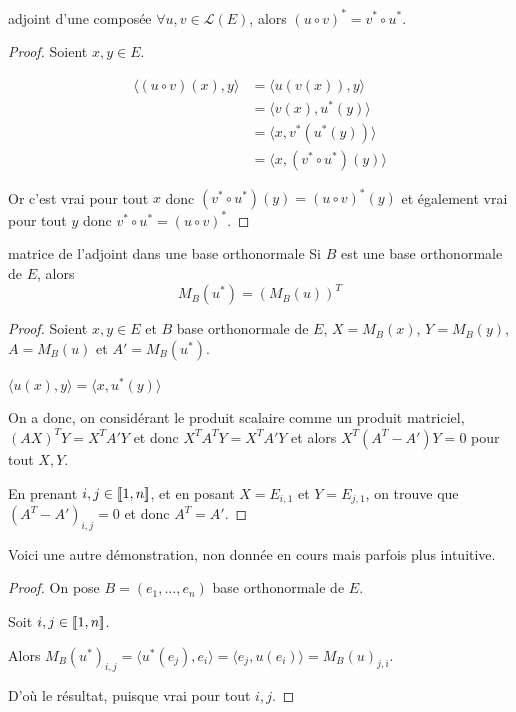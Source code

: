 \begin{proposition}{adjoint d'une composée}{}
    $\forall u, v \in \mathscr L(E)$, alors $(u \circ v)^* = v^* \circ u^*$.
\end{proposition}


\begin{proof}
    Soient $x, y \in E$. 

    \begin{align}
        \langle (u \circ v)(x), y \rangle & = \langle u(v(x)), y \rangle \\
        & = \langle v(x), u^*(y) \rangle \\
        & = \langle x, v^*(u^*(y)) \rangle \\
        & = \langle x, (v^* \circ u^*)(y) \rangle
    \end{align}

    Or c'est vrai pour tout $x$ donc $(v^* \circ u^*)(y) = (u \circ v)^*(y)$ et 
    également vrai pour tout $y$ donc $v^* \circ u^* = (u \circ v)^*$.
\end{proof}

\begin{proposition}{matrice de l'adjoint dans une base orthonormale}{}
    Si $B$ est une base orthonormale de $E$, alors 
    $$M_B(u^*) = (M_B(u))^T$$
\end{proposition}

\begin{proof}
    Soient $x, y \in E$ et $B$ base orthonormale de $E$, $X = M_B(x)$, $Y = M_B(y)$, 
    $A = M_B(u)$ et $A' = M_B(u^*)$.

    $\langle u(x), y \rangle = \langle x, u^*(y) \rangle$ 

    On a donc, on considérant le produit scalaire comme un produit matriciel, 
    $(AX)^T Y = X^T A' Y$ et donc $X^T A^T Y = X^T A' Y$ 
    et alors $X^T(A^T - A') Y = 0$ pour tout $X, Y$.

    En prenant $i, j \in [\![1, n]\!]$, et en posant $X = E_{i, 1}$ et $Y = E_{j, 1}$, 
    on trouve que $(A^T - A')_{i, j} = 0$ et donc $A^T = A'$.

\end{proof}

Voici une autre démonstration, non donnée en cours mais parfois plus intuitive.

\begin{proof}
    On pose $B = (e_1, \dots, e_n)$ base orthonormale de $E$.

    Soit $i, j \in [\![1, n]\!]$. 

    Alors $M_B(u^*)_{i, j} = \langle u^*(e_j), e_i \rangle = \langle e_j, u(e_i) \rangle = M_B(u)_{j, i}$.

    D'où le résultat, puisque vrai pour tout $i, j$.
\end{proof}

